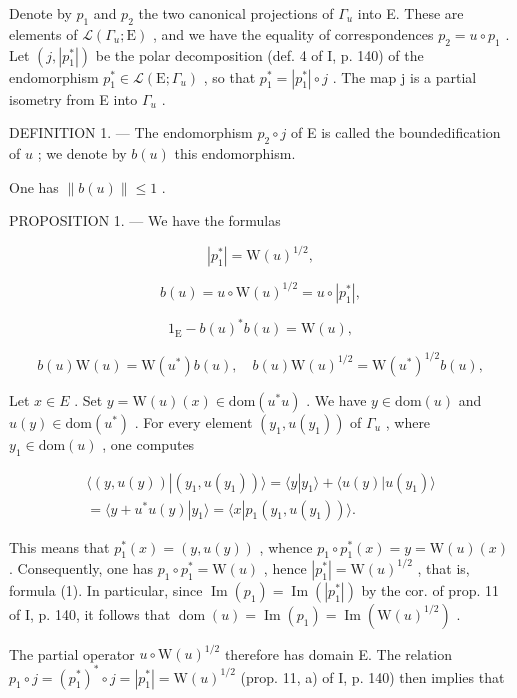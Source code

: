 Denote by \(p_{1}\) and \(p_{2}\) the two canonical projections of \(\Gamma_{u}\) into E. These are elements of \(\mathcal{L}(\Gamma_{u};\mathrm{E})\) , and we have the equality of correspondences \(p_{2}=u\circ p_{1}\) . Let \((j,|p_{1}^{*}|)\) be the polar decomposition (def. 4 of I, p. 140) of the endomorphism \(p_{1}^{*}\in\mathcal{L}(\mathrm{E};\Gamma_{u})\) , so that \(p_{1}^{*}=|p_{1}^{*}|\circ j\) . The map j is a partial isometry from E into \(\Gamma_{u}\) .

DEFINITION 1. --- The endomorphism \(p_2 \circ j\) of E is called the boundedification of \(u\) ; we denote by \(b(u)\) this endomorphism.

One has \(\|b(u)\|\leqslant1\) .

PROPOSITION 1. --- We have the formulas

\[
| p _ {1} ^ {*} | = \mathrm{W} (u) ^ {1 / 2},\tag{1}
\]

\[
b (u) = u \circ \mathrm{W} (u) ^ {1 / 2} = u \circ | p _ {1} ^ {*} |,\tag{2}
\]

\[
1 _ {\mathrm{E}} - b (u) ^ {*} b (u) = \mathrm{W} (u),\tag{3}
\]

\[
b (u) \mathrm{W} (u) = \mathrm{W} (u ^ {*}) b (u), \quad b (u) \mathrm{W} (u) ^ {1 / 2} = \mathrm{W} (u ^ {*}) ^ {1 / 2} b (u),\tag{4}
\]

Let \(x \in E\) . Set \(y = \mathrm{W}(u)(x) \in \mathrm{dom}(u^{*}u)\) . We have \(y \in \mathrm{dom}(u)\) and \(u(y) \in \mathrm{dom}(u^{*})\) . For every element \((y_{1}, u(y_{1}))\) of \(\Gamma_{u}\) , where \(y_{1} \in \mathrm{dom}(u)\) , one computes

\[
\begin{array}{c} \langle (y, u (y)) | (y _ {1}, u (y _ {1})) \rangle = \langle y | y _ {1} \rangle + \langle u (y) | u (y _ {1}) \rangle \\ = \langle y + u ^ {*} u (y) | y _ {1} \rangle = \langle x | p _ {1} (y _ {1}, u (y _ {1})) \rangle . \end{array}
\]

This means that \(p_{1}^{*}(x) = (y, u(y))\) , whence \(p_{1} \circ p_{1}^{*}(x) = y = \mathrm{W}(u)(x)\) . Consequently, one has \(p_{1} \circ p_{1}^{*} = \mathrm{W}(u)\) , hence \(|p_{1}^{*}| = \mathrm{W}(u)^{1/2}\) , that is, formula (1). In particular, since \(\operatorname{Im}(p_{1}) = \operatorname{Im}(|p_{1}^{*}|)\) by the cor. of prop. 11 of I, p. 140, it follows that \(\operatorname{dom}(u) = \operatorname{Im}(p_{1}) = \operatorname{Im}(\mathrm{W}(u)^{1/2})\) .

The partial operator \(u \circ \mathrm{W}(u)^{1/2}\) therefore has domain E. The relation \(p_1 \circ j = (p_1^*)^* \circ j = |p_1^*| = \mathrm{W}(u)^{1/2}\) (prop. 11, a) of I, p. 140) then implies that

